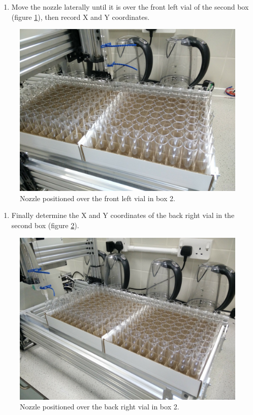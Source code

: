 \documentclass[]{book}
\providecommand{\tightlist}{%
  \setlength{\itemsep}{0pt}\setlength{\parskip}{0pt}}
\theoremstyle{definition}
\theoremstyle{definition}
\theoremstyle{remark}
\begin{document}
\begin{enumerate}
\def\labelenumi{\arabic{enumi}.}
\setcounter{enumi}{5}
\tightlist
\item
  Move the nozzle laterally until it is over the front left vial of the
  second box (figure \ref{fig:box2FrontLeft}), then record X and Y
  coordinates.
\end{enumerate}

\begin{figure}

{\centering \includegraphics[width=0.5\linewidth]{images/box2_first_vial} 

}

\caption{Nozzle positioned over the front left vial in box 2.}\label{fig:box2FrontLeft}
\end{figure}

\begin{enumerate}
\def\labelenumi{\arabic{enumi}.}
\setcounter{enumi}{6}
\tightlist
\item
  Finally determine the X and Y coordinates of the back right vial in
  the second box (figure \ref{fig:box2BackRight}).
\end{enumerate}

\begin{figure}

{\centering \includegraphics[width=0.5\linewidth]{images/box2_last_vial} 

}

\caption{Nozzle positioned over the back right vial in box 2.}\label{fig:box2BackRight}
\end{figure}
\end{document}
